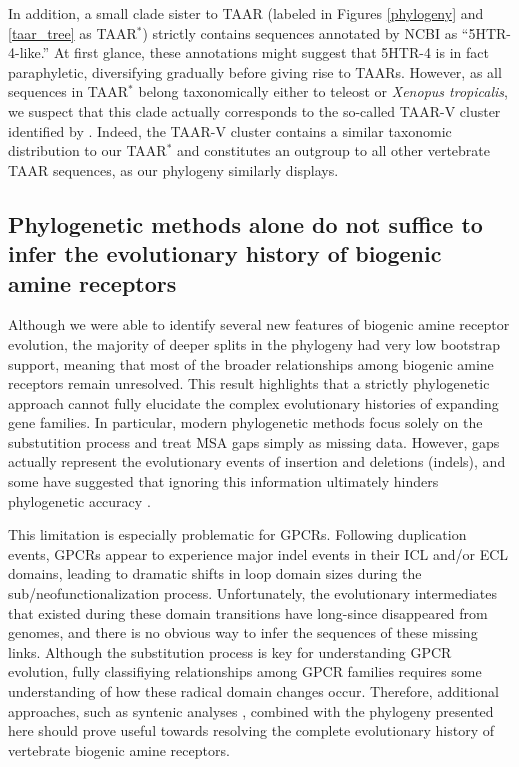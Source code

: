 \documentclass[fleqn,10pt]{wlpeerj}
\begin{document}
In addition, a small clade sister to TAAR (labeled in Figures \ref{phylogeny} and \ref{taar_tree} as TAAR$^\ast$) strictly contains sequences annotated by NCBI as ``5HTR-4-like.'' At first glance, these annotations might suggest that 5HTR-4 is in fact paraphyletic, diversifying gradually before giving rise to TAARs. However, as all sequences in TAAR$^\ast$ belong taxonomically either to teleost or \emph{Xenopus tropicalis}, we suspect that this clade actually corresponds to the so-called TAAR-V cluster identified by \cite{Hashiguchi2007}. Indeed, the TAAR-V cluster contains a similar taxonomic distribution to our TAAR$^\ast$ and constitutes an outgroup to all other vertebrate TAAR sequences, as our phylogeny similarly displays.

\subsection*{Phylogenetic methods alone do not suffice to infer the evolutionary history of biogenic amine receptors}
Although we were able to identify several new features of biogenic amine receptor evolution, the majority of deeper splits in the phylogeny had very low bootstrap support, meaning that most of the broader relationships among biogenic amine receptors remain unresolved. This result highlights that a strictly phylogenetic approach cannot fully elucidate the complex evolutionary histories of expanding gene families. In particular, modern phylogenetic methods focus solely on the substutition process and treat MSA gaps simply as missing data. However, gaps actually represent the evolutionary events of insertion and deletions (indels), and some have suggested that ignoring this information ultimately hinders phylogenetic accuracy \citep{Morrison2008,Loytynoja2008,Warnow2012,Luanetal2013}. 

This limitation is especially problematic for GPCRs. Following duplication events, GPCRs appear to experience major indel events in their ICL and/or ECL domains, leading to dramatic shifts in loop domain sizes during the sub/neofunctionalization process. Unfortunately, the evolutionary intermediates that existed during these domain transitions have long-since disappeared from genomes, and there is no obvious way to infer the sequences of these missing links. Although the substitution process is key for understanding GPCR evolution, fully classifiying relationships among GPCR families requires some understanding of how these radical domain changes occur. Therefore, additional approaches, such as syntenic analyses \citep{Sundstrom2010,Widmark2011,YegorovGood2012,Hwangetal2013}, combined with the phylogeny presented here should prove useful towards resolving the complete evolutionary history of vertebrate biogenic amine receptors. 
\end{document}
